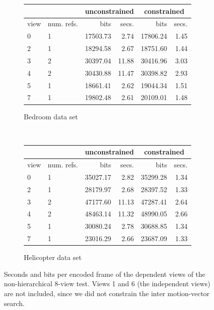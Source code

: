 \documentclass{sig-alternate-05-2015}
\begin{document}
\begin{figure}[h]
\centering\small
\begin{subfigure}{.4\textwidth}
\centering
\begin{tabular}{|l|l|r|r|r|r|}
\multicolumn{2}{c}{} & \multicolumn{2}{c}{unconstrained} & \multicolumn{2}{c}{constrained} \\ \hline
view & num. refs.    & bits            & secs.           & bits            & secs.         \\ \hline
0    & 1             & 17503.73        & 2.74            & 17806.24        & 1.45          \\ \hline
2    & 1             & 18294.58        & 2.67            & 18751.60        & 1.44          \\ \hline
3    & 2             & 30397.04        & 11.88           & 30416.96        & 3.03          \\ \hline
4    & 2             & 30430.88        & 11.47           & 30398.82        & 2.93          \\ \hline
5    & 1             & 18661.41        & 2.62            & 19044.34        & 1.51          \\ \hline
7    & 1             & 19802.48        & 2.61            & 20109.01        & 1.48          \\ \hline
\end{tabular}
\caption{Bedroom data set}
\label{fig:bedroom-time-constrained}
\end{subfigure} \\
\begin{subfigure}{.4\textwidth}
\centering
\begin{tabular}{|l|l|r|r|r|r|}
\multicolumn{2}{c}{} & \multicolumn{2}{c}{unconstrained} & \multicolumn{2}{c}{constrained} \\ \hline
view & num. refs.    & bits            & secs.           & bits            & secs.         \\ \hline
0    & 1             & 35027.17        & 2.82            & 35299.28        & 1.34          \\ \hline
2    & 1             & 28179.97        & 2.68            & 28397.52        & 1.33          \\ \hline
3    & 2             & 47177.60        & 11.13           & 47287.41        & 2.64          \\ \hline
4    & 2             & 48463.14        & 11.32           & 48990.05        & 2.66          \\ \hline
5    & 1             & 30080.24        & 2.78            & 30688.85        & 1.34          \\ \hline
7    & 1             & 23016.29        & 2.66            & 23687.09        & 1.33          \\ \hline
\end{tabular}
\caption{Helicopter data set}
\label{fig:helicopter-time-constrained}
\end{subfigure}
\caption{Seconds and bits per encoded frame of the dependent views of the
non-hierarchical 8-view test. Views 1 and 6 (the independent views) are not
included, since we did not constrain the inter motion-vector search.}
\label{fig:time-constrained}
\end{figure}
\end{document}
